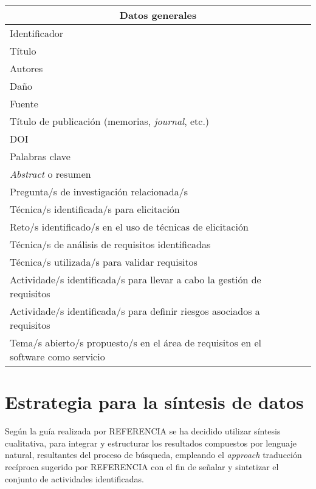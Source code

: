 \documentclass{article}
\begin{document}
\begin{center}
\begin{tabular}{ |l|l| }
\hline
\multicolumn{2}{|c|}{Datos generales} \\
  \hline
    Identificador &       \\
    \hline
    Título & \\
    \hline
    Autores &\\
    \hline
    Daño & \\
    \hline
    Fuente & \\
    \hline
    Título de publicación (memorias, \emph{journal}, etc.) & \\
    \hline
    DOI & \\
    \hline
    Palabras clave & \\
    \hline
    \emph{Abstract} o resumen & \\
    \hline
    Pregunta/s de investigación relacionada/s & \\
    \hline
    Técnica/s identificada/s para elicitación& \\
    \hline
    Reto/s identificado/s en el uso de técnicas de elicitación& \\
    \hline
    Técnica/s de análisis de requisitos identificadas& \\
    \hline
    Técnica/s utilizada/s para validar requisitos & \\
    \hline
    Actividade/s identificada/s para llevar a cabo la gestión de requisitos& \\
    \hline
    Actividade/s identificada/s para definir riesgos asociados a requisitos& \\
    \hline
    Tema/s abierto/s propuesto/s en el área de requisitos en el software como servicio& \\
    \hline
 \hline
\end{tabular}
\end{center}


\section{Estrategia para la síntesis de datos}
Según la guía realizada por REFERENCIA se ha decidido utilizar síntesis cualitativa, para integrar y estructurar los resultados compuestos por 
lenguaje natural, resultantes del proceso de búsqueda, empleando el \emph{approach} traducción recíproca sugerido por REFERENCIA con el fin de señalar 
y sintetizar el conjunto de actividades identificadas.
\newpage
\end{document}
